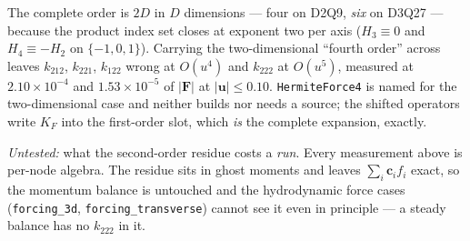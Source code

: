 \documentclass[11pt,a4paper]{article}
\newcommand{\code}[1]{\texttt{\small #1}}
\begin{document}
\begin{enumerate}[leftmargin=1.4em,itemsep=4pt]
  The complete order is $2D$ in $D$ dimensions --- four on D2Q9, \emph{six} on
  D3Q27 --- because the product index set closes at exponent two per axis
  ($H_3\equiv0$ and $H_4\equiv-H_2$ on $\{-1,0,1\}$). Carrying the
  two-dimensional ``fourth order'' across leaves $k_{212}$, $k_{221}$, $k_{122}$
  wrong at $O(u^4)$ and $k_{222}$ at $O(u^5)$, measured at $2.10\times10^{-4}$
  and $1.53\times10^{-5}$ of $|\bm{F}|$ at $|\bm{u}|\le0.10$. \code{HermiteForce4}
  is named for the two-dimensional case and neither builds nor needs a source;
  the shifted operators write $K_F$ into the first-order slot, which \emph{is}
  the complete expansion, exactly.

  \emph{Untested:} what the second-order residue costs a \emph{run}. Every
  measurement above is per-node algebra. The residue sits in ghost moments and
  leaves $\sum_i\bm{c}_if_i$ exact, so the momentum balance is untouched and the
  hydrodynamic force cases (\code{forcing\_3d}, \code{forcing\_transverse})
  cannot see it even in principle --- a steady balance has no $k_{222}$ in it.


\end{enumerate}
\end{document}
